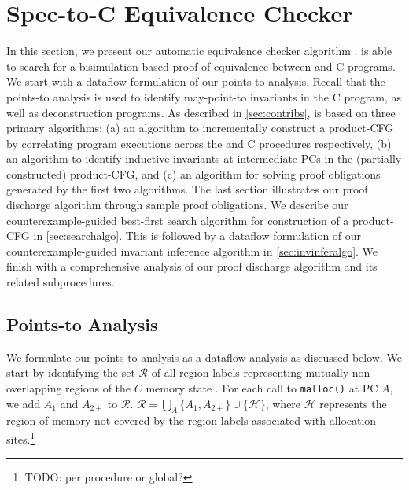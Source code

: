 \section{Spec-to-C Equivalence Checker}
\label{sec:spectocalgo}
In this section, we present our automatic equivalence checker algorithm \toolName{}.
\toolName{} is able to search for a bisimulation based proof of equivalence
between \SpecL{} and C programs.
We start with a dataflow formulation of our points-to analysis.
Recall that the points-to analysis is used to identify may-point-to invariants in the C program,
as well as deconstruction programs.
As described in \cref{sec:contribs}, \toolName{} is based on three primary algorithms:
(a) an algorithm to incrementally construct a product-CFG by correlating program executions across
the \SpecL{} and C procedures respectively,
(b) an algorithm to identify inductive invariants at intermediate PCs in the (partially constructed)
product-CFG, and (c) an algorithm for solving proof obligations generated by the first two algorithms.
The last section illustrates our proof discharge algorithm through sample proof obligations.
We describe our counterexample-guided best-first search algorithm for
construction of a product-CFG in \cref{sec:searchalgo}.
This is followed by a dataflow formulation of our counterexample-guided invariant inference algorithm in \cref{sec:invinferalgo}.
We finish with a comprehensive analysis of our proof discharge algorithm and its related subprocedures.

\subsection{Points-to Analysis}
\label{sec:pointsToFormal}
We formulate our points-to analysis as a dataflow analysis as discussed below.
We start by identifying the set $\mathcal{R}$ of all region labels representing mutually non-overlapping
regions of the $C$ memory state \mem{}.
For each call to {\tt malloc()} at PC $A$, we add $A_1$ and $A_{2+}$ to $\mathcal{R}$. $\mathcal{R} = \bigcup_{A} \{ A_1, A_{2+} \} \cup \{ \mathcal{H} \}$,
where $\mathcal{H}$ represents the region of memory \mem{} not covered by the region labels associated with allocation sites.\footnote{TODO: per procedure or global?}

